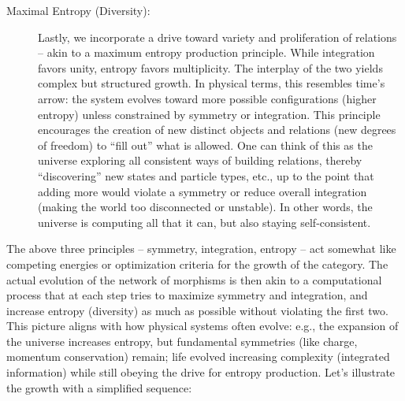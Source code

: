 \documentclass{article}
\begin{document}
\begin{description}
\item[Maximal Entropy (Diversity):] Lastly, we incorporate a drive toward variety and proliferation of relations – akin to a maximum entropy production principle. While integration favors unity, entropy favors multiplicity. The interplay of the two yields complex but structured growth. In physical terms, this resembles time’s arrow: the system evolves toward more possible configurations (higher entropy) unless constrained by symmetry or integration. This principle encourages the creation of new distinct objects and relations (new degrees of freedom) to “fill out” what is allowed. One can think of this as the universe exploring all consistent ways of building relations, thereby “discovering” new states and particle types, etc., up to the point that adding more would violate a symmetry or reduce overall integration (making the world too disconnected or unstable). In other words, the universe is computing all that it can, but also staying self-consistent.
\end{description}

The above three principles – symmetry, integration, entropy – act somewhat like competing energies or optimization criteria for the growth of the category. The actual evolution of the network of morphisms is then akin to a computational process that at each step tries to maximize symmetry and integration, and increase entropy (diversity) as much as possible without violating the first two. This picture aligns with how physical systems often evolve: e.g., the expansion of the universe increases entropy, but fundamental symmetries (like charge, momentum conservation) remain; life evolved increasing complexity (integrated information) while still obeying the drive for entropy production. Let’s illustrate the growth with a simplified sequence:
\end{document}
